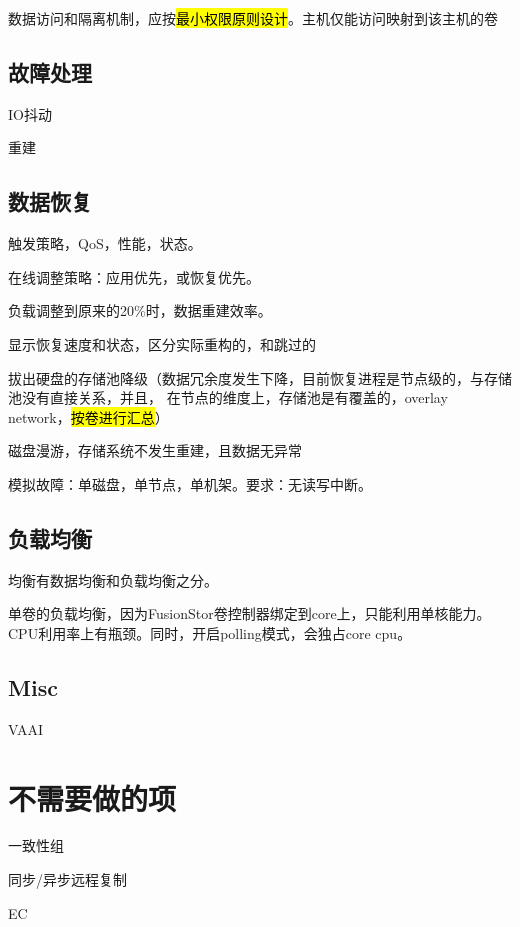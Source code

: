 数据访问和隔离机制，应按\hl{最小权限原则设计}。主机仅能访问映射到该主机的卷

\subsection{故障处理}

\begin{enumbox}
    \item IO抖动
    \item 重建
\end{enumbox}

\subsection{数据恢复}

触发策略，QoS，性能，状态。

\begin{enumbox}
    \item 在线调整策略：应用优先，或恢复优先。
    \item 负载调整到原来的20\%时，数据重建效率。
    \item 显示恢复速度和状态，区分实际重构的，和跳过的
    \item 拔出硬盘的存储池降级（数据冗余度发生下降，目前恢复进程是节点级的，与存储池没有直接关系，并且，
        在节点的维度上，存储池是有覆盖的，overlay network，\hl{按卷进行汇总}）
    \item 磁盘漫游，存储系统不发生重建，且数据无异常
    \item 模拟故障：单磁盘，单节点，单机架。要求：无读写中断。
\end{enumbox}

\subsection{负载均衡}

均衡有数据均衡和负载均衡之分。

单卷的负载均衡，因为FusionStor卷控制器绑定到core上，只能利用单核能力。
CPU利用率上有瓶颈。同时，开启polling模式，会独占core cpu。

\subsection{Misc}

VAAI

\section{不需要做的项}

\begin{enumbox}
    \item 一致性组
    \item 同步/异步远程复制
    \item EC
\end{enumbox}
